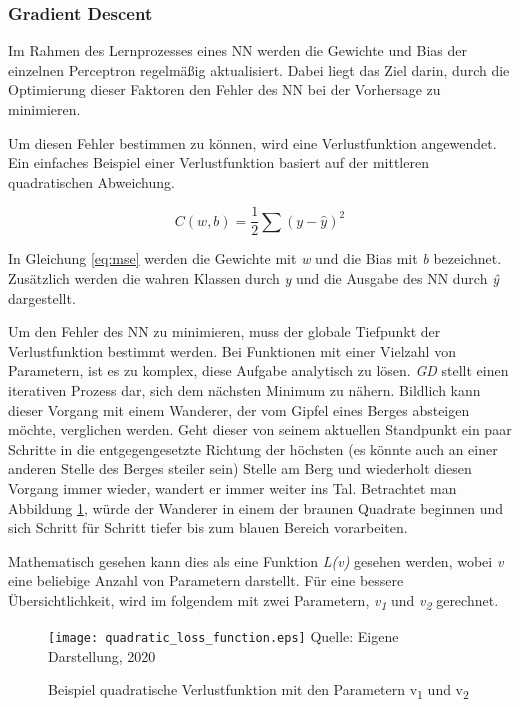 \subsubsection{Gradient Descent}
Im Rahmen des Lernprozesses eines \ac{NN} werden die Gewichte und Bias der einzelnen Perceptron regelmäßig aktualisiert. Dabei liegt das Ziel darin, durch die Optimierung dieser Faktoren den Fehler des \ac{NN} bei der Vorhersage zu minimieren.

Um diesen Fehler bestimmen zu können, wird eine Verlustfunktion angewendet. Ein einfaches Beispiel einer Verlustfunktion basiert auf der mittleren quadratischen Abweichung.

\begin{equation} \label{eq:mse}
    C(w,b) = \frac{1}{2} \sum (y-\hat{y})^2
\end{equation}

In Gleichung \ref{eq:mse} werden die Gewichte mit \textit{w} und die Bias mit \textit{b} bezeichnet. Zusätzlich werden die wahren Klassen durch \textit{y} und die Ausgabe des \ac{NN} durch \textit{\^{y}} dargestellt. 


Um den Fehler des \ac{NN} zu minimieren, muss der globale Tiefpunkt der Verlustfunktion bestimmt werden. Bei Funktionen mit einer Vielzahl von Parametern, ist es zu komplex, diese Aufgabe analytisch zu lösen. \textit{\ac{GD}} stellt einen iterativen Prozess dar, sich dem nächsten Minimum zu nähern. Bildlich kann dieser Vorgang mit einem Wanderer, der vom Gipfel eines Berges absteigen möchte, verglichen werden. Geht dieser von seinem aktuellen Standpunkt ein paar Schritte in die entgegengesetzte Richtung der höchsten (es könnte auch an einer anderen Stelle des Berges steiler sein) Stelle am Berg und wiederholt diesen Vorgang immer wieder, wandert er immer weiter ins Tal. Betrachtet man Abbildung \ref{fig:quadLoss}, würde der Wanderer in einem der braunen Quadrate beginnen und sich Schritt für Schritt tiefer bis zum blauen Bereich vorarbeiten. 

Mathematisch gesehen kann dies als eine Funktion \textit{L(v)} gesehen werden, wobei \textit{v} eine beliebige Anzahl von Parametern darstellt. Für eine bessere Übersichtlichkeit, wird im folgendem mit zwei Parametern, \textit{v\textsubscript{1}} und \textit{v\textsubscript{2}} gerechnet.

\begin{figure}[t]
    \centering
    \caption[]{Beispiel quadratische Verlustfunktion mit den Parametern v\textsubscript{1} und v\textsubscript{2}}
	\label{fig:quadLoss}
    \texttt{[image: quadratic\_loss\_function.eps]}
    Quelle: Eigene Darstellung, 2020
\end{figure}

